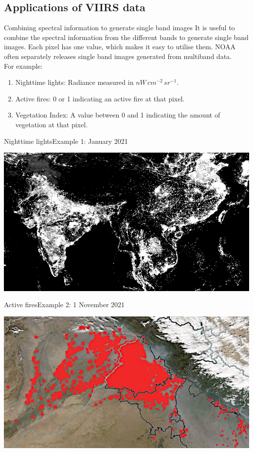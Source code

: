\documentclass[aspectratio=169]{beamer} %
\newcommand{\radUnit}{$nW\, cm^{-2}\, sr^{-1}$}
\begin{document}
\subsection{Applications of VIIRS data}

\begin{frame}{Combining spectral information to generate single band images}
  It is useful to combine the spectral information from the different bands to generate single band images. Each pixel has one value, which makes it easy to utilise them. NOAA often separately releases single band images generated from multiband data. 
  \\
  For example: 
  \begin{enumerate}
    \item Nighttime lights: Radiance measured in \radUnit.  
    \item Active fires: 0 or 1 indicating an active fire at that pixel. 
    \item Vegetation Index: A value between 0 and 1 indicating the amount of vegetation at that pixel.
  \end{enumerate}  
\end{frame}

\begin{frame}{Nighttime lights}{Example 1: January 2021}
  \begin{center}
    \includegraphics[width = .7\linewidth]{ntl.png}
  \end{center}
\end{frame}

\begin{frame}{Active fires}{Example 2: 1 November 2021}
  \begin{center}
    \includegraphics[width = .7\linewidth]{fires.png}
  \end{center}
\end{frame}
\end{document}
